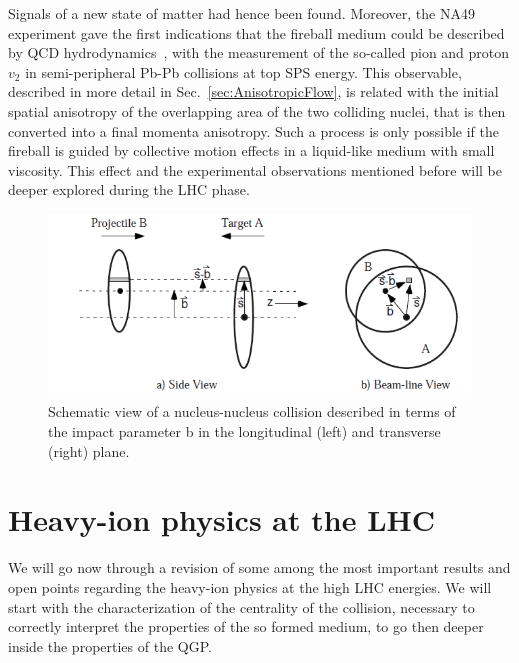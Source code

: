 Signals of a new state of matter had hence been found.
Moreover, the NA49 experiment gave the first indications that the fireball medium could be described by QCD hydrodynamics~\cite{}, with the measurement
of the so-called pion and proton $v_{2}$ in semi-peripheral Pb-Pb collisions at top SPS energy. This observable, described in more detail in Sec.~\ref{sec:AnisotropicFlow}, is related with the
initial spatial anisotropy of the overlapping area of the two colliding nuclei, that is then converted into a final momenta anisotropy. Such a process is only possible if the fireball is guided by collective motion effects in a liquid-like medium with  small viscosity.
This effect and the experimental observations mentioned before will be deeper explored during the LHC phase. 
\begin{figure}[!b]
  \centering
  \includegraphics[width=12cm]{FigCap1/glauber.png}
  \caption{Schematic view of a nucleus-nucleus collision described in terms of the impact parameter b in the longitudinal (left) and transverse (right) plane.}
  \label{fig:image10}
\end{figure}

\section{Heavy-ion physics at the LHC}
We will go now through a revision of some among the most important results and open points regarding the heavy-ion physics at the high LHC energies. We will start with the characterization of the centrality of the collision, necessary to correctly interpret the properties of the so formed medium, to go then deeper inside the properties of the QGP.

